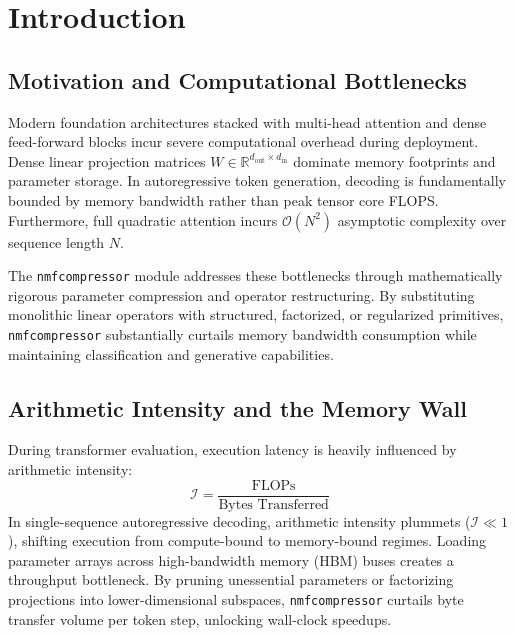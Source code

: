 \section{Introduction}

\subsection{Motivation and Computational Bottlenecks}
Modern foundation architectures stacked with multi-head attention and dense feed-forward blocks incur severe computational overhead during deployment. Dense linear projection matrices $W \in \mathbb{R}^{d_{\text{out}} \times d_{\text{in}}}$ dominate memory footprints and parameter storage. In autoregressive token generation, decoding is fundamentally bounded by memory bandwidth rather than peak tensor core FLOPS. Furthermore, full quadratic attention incurs $\mathcal{O}(N^2)$ asymptotic complexity over sequence length $N$.

The \texttt{nmfcompressor} module addresses these bottlenecks through mathematically rigorous parameter compression and operator restructuring. By substituting monolithic linear operators with structured, factorized, or regularized primitives, \texttt{nmfcompressor} substantially curtails memory bandwidth consumption while maintaining classification and generative capabilities.

\subsection{Arithmetic Intensity and the Memory Wall}
During transformer evaluation, execution latency is heavily influenced by arithmetic intensity:
\[
\mathcal{I} = \frac{\text{FLOPs}}{\text{Bytes Transferred}}
\]
In single-sequence autoregressive decoding, arithmetic intensity plummets ($\mathcal{I} \ll 1$), shifting execution from compute-bound to memory-bound regimes. Loading parameter arrays across high-bandwidth memory (HBM) buses creates a throughput bottleneck. By pruning unessential parameters or factorizing projections into lower-dimensional subspaces, \texttt{nmfcompressor} curtails byte transfer volume per token step, unlocking wall-clock speedups.

